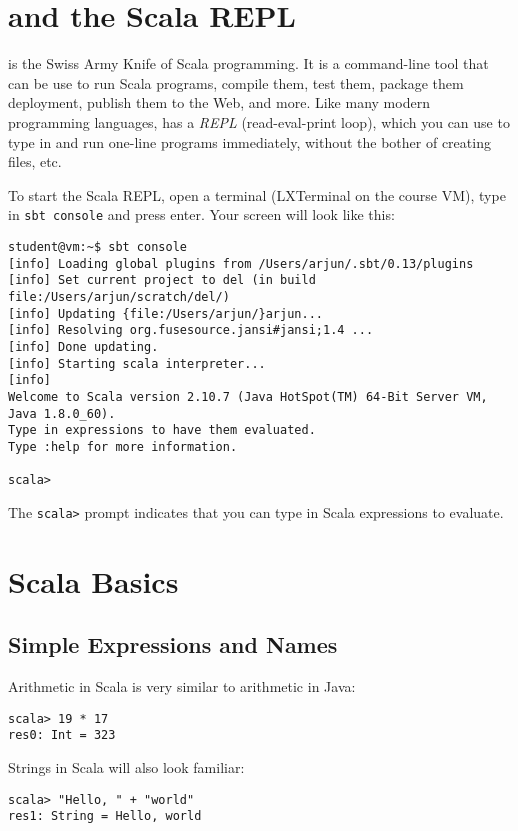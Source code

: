 \documentclass{book}
\begin{document}
\section{\sbt{} and the Scala REPL}

\sbt{} is the Swiss Army Knife of Scala programming. It is a command-line tool
that can be use to run Scala programs, compile them, test them, package them
deployment, publish them to the Web, and more. Like many modern programming
languages, \sbt{} has a \emph{REPL} (read-eval-print loop), which you can use to
type in and run one-line programs immediately, without the bother of creating
files, etc.

To start the Scala REPL, open a terminal (LXTerminal on the course VM),
type in \verb|sbt console| and press enter. Your screen will look like this:
%
\begin{verbatim}
student@vm:~$ sbt console
[info] Loading global plugins from /Users/arjun/.sbt/0.13/plugins
[info] Set current project to del (in build file:/Users/arjun/scratch/del/)
[info] Updating {file:/Users/arjun/}arjun...
[info] Resolving org.fusesource.jansi#jansi;1.4 ...
[info] Done updating.
[info] Starting scala interpreter...
[info]
Welcome to Scala version 2.10.7 (Java HotSpot(TM) 64-Bit Server VM, Java 1.8.0_60).
Type in expressions to have them evaluated.
Type :help for more information.

scala>
\end{verbatim}

The \verb|scala>| prompt indicates that you can type in Scala expressions to evaluate.

\section{Scala Basics}

\subsection{Simple Expressions and Names}

Arithmetic in Scala is very similar to arithmetic in Java:

\begin{verbatim}
scala> 19 * 17
res0: Int = 323
\end{verbatim}

Strings in Scala will also look familiar:

\begin{verbatim}
scala> "Hello, " + "world"
res1: String = Hello, world
\end{verbatim}
\end{document}
